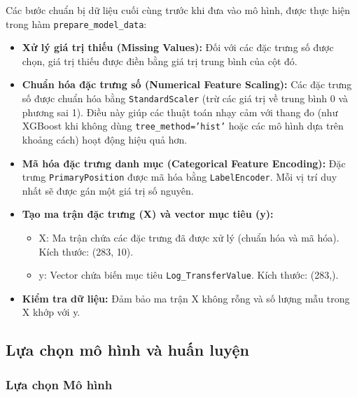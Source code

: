 \documentclass[12pt, a4paper]{report}
\begin{document}
Các bước chuẩn bị dữ liệu cuối cùng trước khi đưa vào mô hình, được thực hiện trong hàm \texttt{prepare\_model\_data}:
\begin{itemize}
    \item \textbf{Xử lý giá trị thiếu (Missing Values):} Đối với các đặc trưng số được chọn, giá trị thiếu được điền bằng giá trị trung bình của cột đó.
    \item \textbf{Chuẩn hóa đặc trưng số (Numerical Feature Scaling):} Các đặc trưng số được chuẩn hóa bằng \texttt{StandardScaler} (trừ các giá trị về trung bình 0 và phương sai 1). Điều này giúp các thuật toán nhạy cảm với thang đo (như XGBoost khi không dùng \texttt{tree\_method='hist'} hoặc các mô hình dựa trên khoảng cách) hoạt động hiệu quả hơn.
    \item \textbf{Mã hóa đặc trưng danh mục (Categorical Feature Encoding):} Đặc trưng \texttt{PrimaryPosition} được mã hóa bằng \texttt{LabelEncoder}. Mỗi vị trí duy nhất sẽ được gán một giá trị số nguyên.
    \item \textbf{Tạo ma trận đặc trưng (X) và vector mục tiêu (y):}
    \begin{itemize}
        \item X: Ma trận chứa các đặc trưng đã được xử lý (chuẩn hóa và mã hóa). Kích thước: (283, 10).
        \item y: Vector chứa biến mục tiêu \texttt{Log\_TransferValue}. Kích thước: (283,).
    \end{itemize}
    \item \textbf{Kiểm tra dữ liệu:} Đảm bảo ma trận X không rỗng và số lượng mẫu trong X khớp với y.
\end{itemize}

\subsection{Lựa chọn mô hình và huấn luyện}
\subsubsection{Lựa chọn Mô hình}
\end{document}
